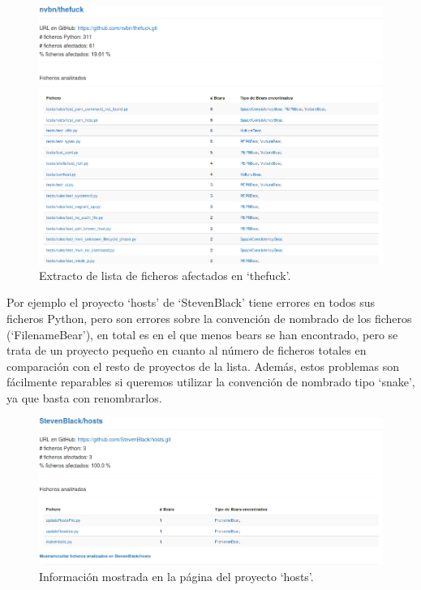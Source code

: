 \documentclass[a4paper, 12pt]{book}
\begin{document}
\begin{figure}[H]
  \centering
  \includegraphics[width=16cm, keepaspectratio]{img/theFuckInfo}
  \caption{Extracto de lista de ficheros afectados en `thefuck'.}
  \label{fig:theFuckInfo}
\end{figure}

Por ejemplo el proyecto `hosts' de `StevenBlack' tiene errores en todos sus ficheros Python, pero son errores sobre la convención de nombrado de los ficheros (`FilenameBear'), en total es en el que menos bears se han encontrado, pero se trata de un proyecto pequeño en cuanto al número de ficheros totales en comparación con el resto de proyectos de la lista. Además, estos problemas son fácilmente reparables si queremos utilizar la convención de nombrado tipo `snake', ya que basta con renombrarlos.

\begin{figure}[H]
  \centering
  \includegraphics[width=15cm, keepaspectratio]{img/proyectoHosts}
  \caption{Información mostrada en la página del proyecto `hosts'.}
  \label{fig:proyectoHosts}
\end{figure}
\end{document}
